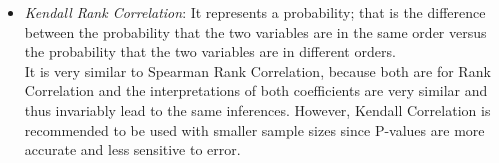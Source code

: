 \documentclass[11pt, twocolumn]{article}
\begin{document}
\begin{itemize}
\begin{itemize}
\item \textit{Kendall Rank Correlation}:
It represents a {\color{blue}probability}; that is the difference between the probability that the two variables are in the same order versus the probability that the two variables are in different orders.\\
It is very similar to Spearman Rank Correlation, because both are for Rank Correlation and the interpretations of both coefficients are very similar and thus invariably lead to the same inferences. However, Kendall Correlation is recommended to be used with {\color{blue}smaller sample sizes} since P-values are more accurate and less sensitive to error.
\end{itemize}
\end{itemize}
\end{document}
